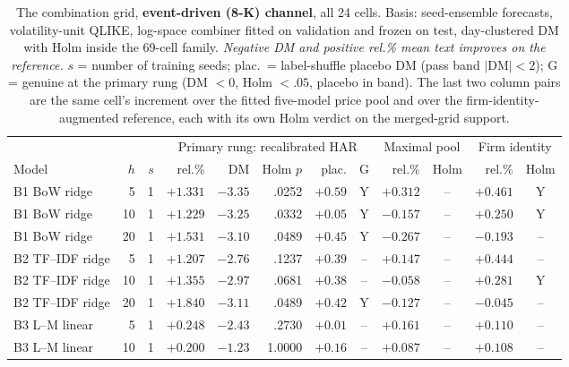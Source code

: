 \begin{table}[htbp]
\centering
\caption[The 69-cell combination grid: event-driven cells]{The
combination grid, \textbf{event-driven (8-K) channel}, all 24 cells.
Basis: seed-ensemble forecasts, volatility-unit QLIKE, log-space
combiner fitted on validation and frozen on test, day-clustered DM with
Holm inside the 69-cell family. \emph{Negative DM and positive rel.\%
mean text improves on the reference.} $s$ = number of training seeds;
plac.\ = label-shuffle placebo DM (pass band $|$DM$|<2$); G = genuine at
the primary rung (DM $<0$, Holm $<.05$, placebo in band). The last two
column pairs are the same cell's increment over the fitted five-model
price pool and over the firm-identity-augmented reference, each with its
own Holm verdict on the merged-grid support.}
\label{tab:app-grid-ed}
\singlespacing\footnotesize
\setlength{\tabcolsep}{3.5pt}
\begin{tabular}{@{}lrrrrrrcrcrc@{}}
\toprule
& & & \multicolumn{5}{c}{Primary rung: recalibrated HAR} & \multicolumn{2}{c}{Maximal pool} & \multicolumn{2}{c}{Firm identity} \\
\cmidrule(lr){4-8}\cmidrule(lr){9-10}\cmidrule(lr){11-12}
Model & $h$ & $s$ & rel.\% & DM & Holm $p$ & plac. & G & rel.\% & Holm & rel.\% & Holm \\
\midrule
B1 BoW ridge       &  5 & 1 & $+1.331$ & $-3.35$ & .0252 & $+0.59$ & Y & $+0.312$ & -- & $+0.461$ & Y \\
B1 BoW ridge       & 10 & 1 & $+1.229$ & $-3.25$ & .0332 & $+0.05$ & Y & $-0.157$ & -- & $+0.250$ & Y \\
B1 BoW ridge       & 20 & 1 & $+1.531$ & $-3.10$ & .0489 & $+0.45$ & Y & $-0.267$ & -- & $-0.193$ & -- \\
B2 TF--IDF ridge   &  5 & 1 & $+1.207$ & $-2.76$ & .1237 & $+0.39$ & -- & $+0.147$ & -- & $+0.444$ & -- \\
B2 TF--IDF ridge   & 10 & 1 & $+1.355$ & $-2.97$ & .0681 & $+0.38$ & -- & $-0.058$ & -- & $+0.281$ & Y \\
B2 TF--IDF ridge   & 20 & 1 & $+1.840$ & $-3.11$ & .0489 & $+0.42$ & Y & $-0.127$ & -- & $-0.045$ & -- \\
B3 L--M linear     &  5 & 1 & $+0.248$ & $-2.43$ & .2730 & $+0.01$ & -- & $+0.161$ & -- & $+0.110$ & -- \\
B3 L--M linear     & 10 & 1 & $+0.200$ & $-1.23$ & 1.0000 & $+0.16$ & -- & $+0.087$ & -- & $+0.108$ & -- \\

\end{tabular}
\end{table}
